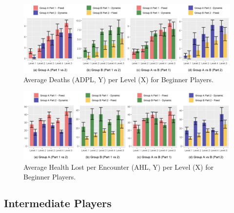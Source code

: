 \begin{figure}[!ht]
    \caption{Average Deaths (ADPL, Y) per Level (X) for Beginner Players.}
    \begin{center}
        \includegraphics[width=34em]{figures/deaths_per_level-beginner_players.png}
    \end{center}
    \label{fig:result-metric-beginners-deaths-per-level}
\end{figure}

\begin{figure}[!ht]
    \caption{Average Health Lost per Encounter (AHL, Y) per Level (X) for Beginner Players.}
    \begin{center}
        \includegraphics[width=34em]{figures/health_lost_per_encounter-beginner_players.png}
    \end{center}
    \label{fig:result-metric-beginners-health-lost-per-encounter}
\end{figure}


\subsection{Intermediate Players}

